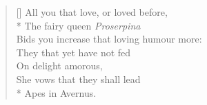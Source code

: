 \documentclass[MAIN]{subfiles}
\begin{document}
\begin{verse}[\versewidth]
All you that love, or loved before,\\*
The fairy queen \emph{Proserpina}\\
Bids you increase that loving humour more:\\
\vin They that yet have not fed\\
\vin \vin On delight amorous,\\
\vin She vows that they shall lead\\*
\vin \vin Apes in {\sc Avernus}.
\end{verse}
\end{document}
